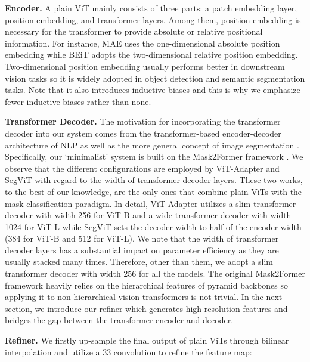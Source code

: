 \documentclass{article} \usepackage{iclr2024_conference,times}
\begin{document}
\textbf{Encoder.} A plain ViT mainly consists of three parts: a patch embedding layer, position embedding, and transformer layers. Among them, position embedding is necessary for the transformer to provide absolute or relative positional information. For instance, MAE \citep{he2022masked} uses the one-dimensional absolute position embedding while BEiT \citep{bao2022beit} adopts the two-dimensional relative position embedding. Two-dimensional position embedding usually performs better in downstream vision tasks so it is widely adopted in object detection and semantic segmentation tasks. Note that it also introduces inductive biases and this is why we emphasize fewer inductive biases rather than none.

\textbf{Transformer Decoder.} The motivation for incorporating the transformer decoder into our system comes from the transformer-based encoder-decoder architecture of NLP \citep{vaswani2017attention} as well as the more general concept of image segmentation \citep{cheng2021per,cheng2022masked}. Specifically, our `minimalist' system is built on the Mask2Former framework \citep{cheng2022masked}. We observe that the different configurations are employed by ViT-Adapter and SegViT with regard to the width of transformer decoder layers. These two works, to the best of our knowledge, are the only ones that combine plain ViTs with the mask classification paradigm. In detail, ViT-Adapter utilizes a slim transformer decoder with width 256 for ViT-B and a wide transformer decoder with width 1024 for ViT-L while SegViT sets the decoder width to half of the encoder width (384 for ViT-B and 512 for ViT-L). We note that the width of transformer decoder layers has a substantial impact on parameter efficiency as they are usually stacked many times. Therefore, other than them, we adopt a slim transformer decoder with width 256 for all the models. The original Mask2Former framework heavily relies on the hierarchical features of pyramid backbones so applying it to non-hierarchical vision transformers is not trivial. In the next section, we introduce our refiner which generates high-resolution features and bridges the gap between the transformer encoder and decoder.

\textbf{Refiner.} We firstly up-sample the final output of plain ViTs through bilinear interpolation and utilize a 33 convolution to refine the feature map:
\end{document}
